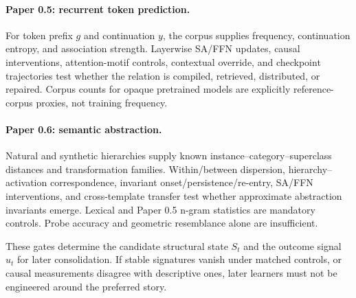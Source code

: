 \documentclass[11pt]{article}
\begin{document}
\paragraph{Paper 0.5: recurrent token prediction.}
For token prefix $g$ and continuation $y$, the corpus supplies frequency, continuation entropy, and association strength. Layerwise SA/FFN updates, causal interventions, attention-motif controls, contextual override, and checkpoint trajectories test whether the relation is compiled, retrieved, distributed, or repaired. Corpus counts for opaque pretrained models are explicitly reference-corpus proxies, not training frequency.

\paragraph{Paper 0.6: semantic abstraction.}
Natural and synthetic hierarchies supply known instance--category--superclass distances and transformation families. Within/between dispersion, hierarchy--activation correspondence, invariant onset/persistence/re-entry, SA/FFN interventions, and cross-template transfer test whether approximate abstraction invariants emerge. Lexical and Paper 0.5 n-gram statistics are mandatory controls. Probe accuracy and geometric resemblance alone are insufficient.

These gates determine the candidate structural state $S_t$ and the outcome signal $u_t$ for later consolidation. If stable signatures vanish under matched controls, or causal measurements disagree with descriptive ones, later learners must not be engineered around the preferred story.
\end{document}

